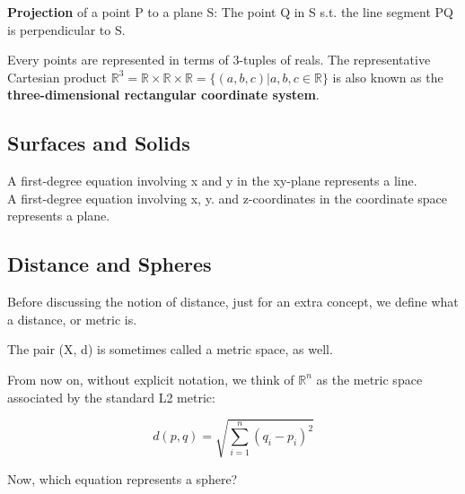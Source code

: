 \documentclass[../main.tex]{subfiles}
\begin{document}
\textbf{Projection} of a point P to a plane S: The point Q in S s.t. the line segment PQ is perpendicular to S.

Every points are represented in terms of 3-tuples of reals. The representative Cartesian product $\mathbb{R}^3 = \mathbb{R}\times\mathbb{R}\times\mathbb{R} = \{(a, b, c) | a,b,c\in\mathbb{R}\}$ is also known as the \textbf{three-dimensional rectangular coordinate system}.

\subsection{Surfaces and Solids}

A first-degree equation involving x and y in the xy-plane represents a line. \\
A first-degree equation involving x, y. and z-coordinates in the coordinate space represents a plane.

\subsection{Distance and Spheres}

Before discussing the notion of distance, just for an extra concept, we define what a distance, or metric is.


The pair (X, d) is sometimes called a metric space, as well.

From now on, without explicit notation, we think of $\mathbb{R}^n$ as the metric space associated by the standard L2 metric:

$$d(p,q)=\sqrt{\sum_{i=1}^{n}(q_i-p_i)^2}$$

Now, which equation represents a sphere?
\end{document}
